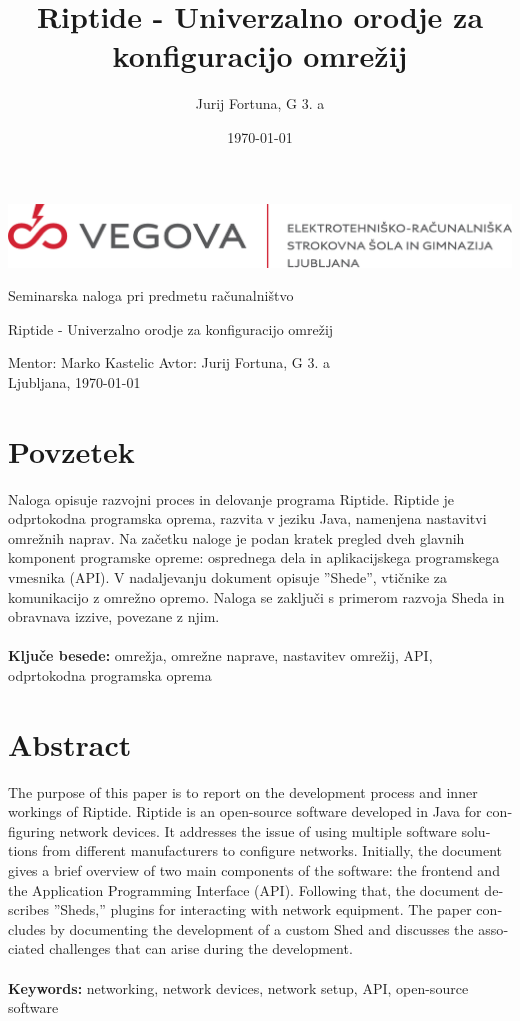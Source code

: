 \documentclass[12pt]{article}
\title{Riptide - Univerzalno orodje za konfiguracijo omrežij}
\author{Jurij Fortuna, G 3. a}
\date{\MMYYYYdate\today}
\begin{document}
\begin{center}
	\thispagestyle{empty}
	\includegraphics[scale=1]{slike/vegova.png}

	\vspace{\fill}
	Seminarska naloga pri predmetu računalništvo

	\Huge{Riptide - Univerzalno orodje za konfiguracijo omrežij}

	\normalsize
	\vspace{\fill}

	Mentor: Marko Kastelic \hfill Avtor: Jurij Fortuna, G 3. a\\
	\null
	Ljubljana, \MMYYYYdate\today
\end{center}
\newpage

\section*{Povzetek}
Naloga opisuje razvojni proces in delovanje programa Riptide. Riptide je
odprtokodna programska oprema, razvita v jeziku Java, namenjena
nastavitvi omrežnih naprav. Na začetku naloge je podan kratek pregled dveh
glavnih komponent programske opreme: osprednega dela in aplikacijskega
programskega vmesnika (API). V nadaljevanju dokument opisuje ''Shede'',
vtičnike za komunikacijo z omrežno opremo. Naloga se zaključi s primerom
razvoja Sheda in obravnava izzive, povezane z njim.
\\\\
\textbf{Ključe besede:} omrežja, omrežne naprave, nastavitev omrežij, API,
odprtokodna programska oprema
\\
\section*{Abstract}
\foreignlanguage{english}{
	The purpose of this paper is to report on the development process and
	inner workings of Riptide. Riptide is an open-source software developed
	in Java for configuring network devices. It addresses the issue of
	using multiple software solutions from different manufacturers to
	configure networks. Initially, the document gives a brief overview of
	two main components of the software: the frontend and the Application
	Programming Interface (API). Following that, the document describes
	''Sheds,'' plugins for interacting with network equipment. The paper
	concludes by documenting the development of a custom Shed and discusses
	the associated challenges that can arise during the development.
	\\\\
	\textbf{Keywords:} networking, network devices, network setup, API,
	open-source software
}
\newpage
\end{document}
